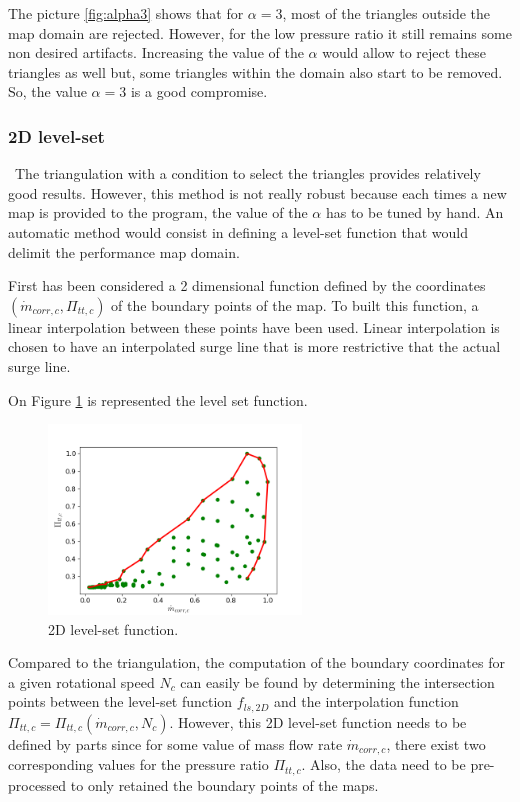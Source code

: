 The picture \ref{fig:alpha3} shows that for $\alpha=3$, most of the triangles outside the map domain are rejected. However, for the low pressure ratio it still remains some non desired artifacts. Increasing the value of the $\alpha$ would allow to reject these
triangles as well but, some triangles within the domain also start to be removed. So, the value $\alpha=3$ is a good compromise.

\subsubsection{2D level-set}
\quad\ The triangulation with a condition to select the triangles provides relatively good results. However, this method is not really robust because each times a new map is provided to the program, the value of the $\alpha$ has to be tuned by hand. An automatic method would consist in defining a level-set function that would delimit the performance map domain.

First has been considered a 2 dimensional function defined by the coordinates $(\dot{m}_{corr,c},\Pi_{tt,c})$ of the boundary points of the map. To built this function, a linear interpolation between these points have been used. Linear interpolation is chosen to have an interpolated surge line that is more restrictive that the actual surge line.

On Figure \ref{fig:C7_LS2D} is represented the level set function.

\begin{figure}[h]
    \centering
    \includegraphics[width=0.6\textwidth]{Comp_map/2D_LS.png}
    \caption{2D level-set function.}
    \label{fig:C7_LS2D}
\end{figure}

Compared to the triangulation, the computation of the boundary coordinates for a given rotational speed $N_c$ can easily be found by determining the intersection points between the level-set function $f_{ls,2D}$ and the interpolation function $\Pi_{tt,c} = \Pi_{tt,c}(\dot{m}_{corr,c},N_c)$. 
However, this 2D level-set function needs to be defined by parts since for some value of mass flow rate $\dot{m}_{corr,c}$, there exist two corresponding values for the pressure ratio $\Pi_{tt,c}$. Also, the data need to be pre-processed to only retained the boundary points of the maps. 

